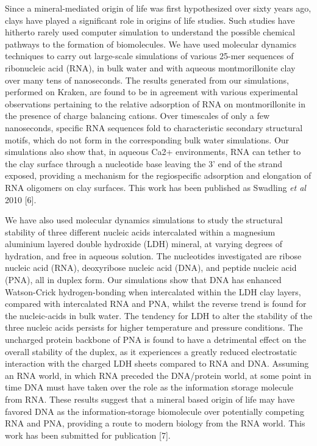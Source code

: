 \documentclass[a4paper,12pt]{article}
\begin{document}
Since a mineral-mediated origin of life was first hypothesized over sixty years ago, clays have 
played a significant role in origins of life studies. Such studies have hitherto rarely used computer 
simulation to understand the possible chemical pathways to the formation of biomolecules. We have used 
molecular dynamics techniques to carry out large-scale simulations of various 25-mer sequences of 
ribonucleic acid (RNA), in bulk water and with aqueous montmorillonite clay over many tens of 
nanoseconds. The results generated from our simulations, performed on Kraken, are found 
to be in agreement with various experimental observations pertaining to the relative adsorption 
of RNA on montmorillonite in the presence of charge balancing cations. Over timescales of only a 
few nanoseconds, specific RNA sequences fold to characteristic secondary structural motifs, which do 
not form in the corresponding bulk water simulations. Our simulations also show that, in aqueous Ca2+
 environments, RNA can tether to the clay surface through a nucleotide base leaving the 3' end of the 
strand exposed, providing a mechanism for the regiospecific adsorption and elongation of RNA oligomers 
on clay surfaces. This work has been published as Swadling \textit{et al} 2010 [6].%

We have also used molecular dynamics simulations to study the structural stability of three different nucleic acids 
intercalated within a magnesium aluminium layered double hydroxide (LDH) mineral, at varying degrees of 
hydration, and free in aqueous solution. The nucleotides investigated are ribose nucleic acid (RNA), 
deoxyribose nucleic acid (DNA), and peptide nucleic acid (PNA), all in duplex form. Our simulations show 
that DNA has enhanced Watson-Crick hydrogen-bonding when intercalated within the LDH clay layers, compared 
with intercalated RNA and PNA, whilst the reverse trend is found for the nucleic-acids in bulk water. 
The tendency for LDH to alter the stability of the three nucleic acids persists for higher temperature 
and pressure conditions. The uncharged protein backbone of PNA is found to have a detrimental effect on 
the overall stability of the duplex, as it experiences a greatly reduced electrostatic interaction with the 
charged LDH sheets compared to RNA and DNA. Assuming an RNA world, in which RNA preceded the DNA/protein 
world, at some point in time DNA must have taken over the role as the information storage molecule from RNA. 
These results suggest that a mineral based origin of life may have favored DNA as the information-storage 
biomolecule over potentially competing RNA and PNA, providing a route to modern biology from the RNA world.
This work has been submitted for publication [7].
\end{document}
